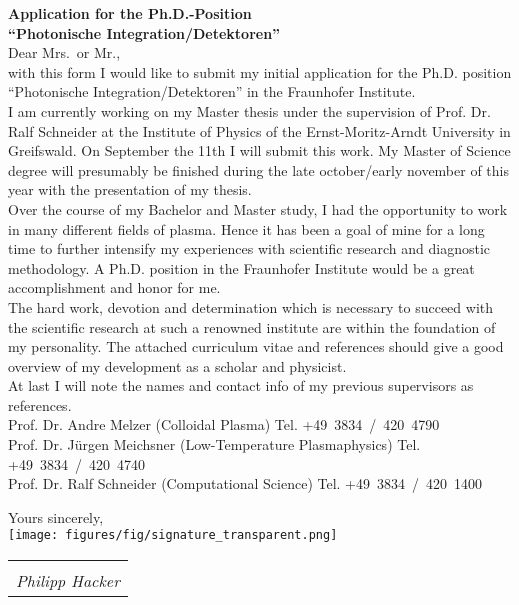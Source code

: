 \documentclass[11pt,a4paper]{moderncv}
\makeatletter
\newcommand{\sign}[1]{%
  \begin{tabular}[t]{@{}l@{}}
  \makebox[1.5in]{\dotfill}\\
  \strut\emph{#1}\strut%
  \end{tabular}%
}
\makeatother
\begin{document}
	\vspace*{1.0cm}
	{\bfseries \color{familynamecolor}%
		Application for the Ph.D.-Position\\
		“Photonische Integration/Detektoren”
	}\\[0.75cm]
%	
	Dear Mrs.\ or Mr.,\\
%	
	with this form I would like to submit my initial application for the Ph.D. position “Photonische Integration/Detektoren” in the Fraunhofer Institute.\\[0.2cm]
%
		I am currently working on my Master thesis under the supervision of Prof. Dr. Ralf Schneider at the Institute of Physics of the Ernst-Moritz-Arndt University in Greifswald. On September the 11th I will submit this work. My Master of Science degree will presumably be finished during the late october/early november of this year with the presentation of my thesis.\\[0.2cm] 
%
		Over the course of my Bachelor and Master study, I had the opportunity to work in many different fields of plasma. Hence it has been a goal of mine for a long time to further intensify my experiences with scientific research and diagnostic methodology. A Ph.D. position in the Fraunhofer Institute would be a great accomplishment and honor for me.\\[0.2cm]
%
		The hard work, devotion and determination which is necessary to succeed with the scientific research at such a renowned institute are within the foundation of my personality. The attached curriculum vitae and references should give a good overview of my development as a scholar and physicist.\\[0.3cm]
%
		At last I will note the names and contact info of my previous supervisors as references.\\[0.2cm]
		\hspace*{0.5cm}Prof. Dr. Andre Melzer (Colloidal Plasma)%
			\hfill Tel. +49~3834~/~420~4790\\
		\hspace*{0.5cm}Prof. Dr. Jürgen Meichsner (Low-Temperature Plasmaphysics)%
			\hfill Tel. +49~3834~/~420~4740\\
		\hspace*{0.5cm}Prof. Dr. Ralf Schneider (Computational Science)%
			\hfill Tel. +49~3834~/~420~1400\\
%
	\vspace*{0.2cm}
	\begin{flushleft}
		Yours sincerely,\\[0.75cm]
		\vspace*{-1.0cm}%
		\texttt{[image: figures/fig/signature\_transparent.png]}
		\hspace*{-4.0cm}\sign{Philipp Hacker}\\[0.0cm]
	\end{flushleft}
%
	\newpage
	\pagestyle{fancy}
\end{document}
